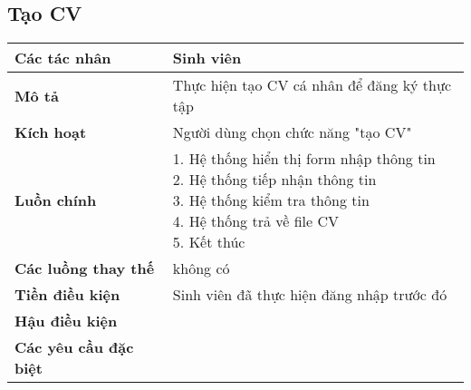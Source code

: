 	\subsection*{Tạo CV}
	\begin{tabular}{|l|l|}
		\hline
		\textbf{Các tác nhân}         & Sinh viên                                             \\
		\hline
		\textbf{Mô tả}                & Thực hiện tạo CV cá nhân để đăng ký thực tập          \\
		\hline
		\textbf{Kích hoạt}            & Người dùng chọn chức năng "tạo CV"                    \\
		\hline
		\textbf{Luồn chính}           & \makecell[l]{1. Hệ thống hiển thị form nhập thông tin \\ 2. Hệ thống tiếp nhận thông tin \\ 3. Hệ thống kiểm tra thông tin \\ 4. Hệ thống trả về file CV \\ 5. Kết thúc} \\
		\hline
		\textbf{Các luồng thay thế}   & không có                                              \\
		\hline
		\textbf{Tiền điều kiện}       & Sinh viên đã thực hiện đăng nhập trước đó             \\
		\hline
		\textbf{Hậu điều kiện}        &                                                       \\
		\hline
		\textbf{Các yêu cầu đặc biệt} &                                                       \\
		\hline
	\end{tabular}

